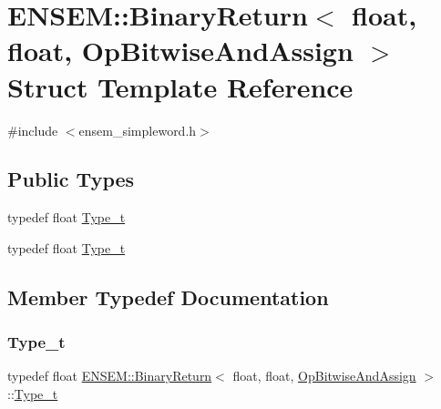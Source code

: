 \hypertarget{structENSEM_1_1BinaryReturn_3_01float_00_01float_00_01OpBitwiseAndAssign_01_4}{}\section{E\+N\+S\+EM\+:\+:Binary\+Return$<$ float, float, Op\+Bitwise\+And\+Assign $>$ Struct Template Reference}
\label{structENSEM_1_1BinaryReturn_3_01float_00_01float_00_01OpBitwiseAndAssign_01_4}


{\ttfamily \#include $<$ensem\+\_\+simpleword.\+h$>$}

\subsection*{Public Types}
\begin{DoxyCompactItemize}
\item 
typedef float \mbox{\hyperlink{structENSEM_1_1BinaryReturn_3_01float_00_01float_00_01OpBitwiseAndAssign_01_4_ad1e9a8f181e2615bea9ad008a77badf5}{Type\+\_\+t}}
\item 
typedef float \mbox{\hyperlink{structENSEM_1_1BinaryReturn_3_01float_00_01float_00_01OpBitwiseAndAssign_01_4_ad1e9a8f181e2615bea9ad008a77badf5}{Type\+\_\+t}}
\end{DoxyCompactItemize}


\subsection{Member Typedef Documentation}
\mbox{\label{structENSEM_1_1BinaryReturn_3_01float_00_01float_00_01OpBitwiseAndAssign_01_4_ad1e9a8f181e2615bea9ad008a77badf5}} 
\subsubsection{\texorpdfstring{Type\_t}{Type\_t}\hspace{0.1cm}{\footnotesize\ttfamily [1/2]}}
{\footnotesize\ttfamily typedef float \mbox{\hyperlink{structENSEM_1_1BinaryReturn}{E\+N\+S\+E\+M\+::\+Binary\+Return}}$<$ float, float, \mbox{\hyperlink{structENSEM_1_1OpBitwiseAndAssign}{Op\+Bitwise\+And\+Assign}} $>$\+::\mbox{\hyperlink{structENSEM_1_1BinaryReturn_3_01float_00_01float_00_01OpBitwiseAndAssign_01_4_ad1e9a8f181e2615bea9ad008a77badf5}{Type\+\_\+t}}}

